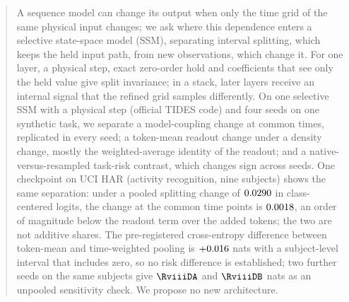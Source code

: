 \documentclass{article}
\theoremstyle{plain}
\theoremstyle{definition}
\theoremstyle{remark}
\begin{document}

\printAffiliationsAndNotice{}

\begin{abstract}
A sequence model can change its output when only the time grid of the same physical input changes; we ask where this dependence enters a selective state-space model (SSM), separating interval splitting, which keeps the held input path, from new observations, which change it.
For one layer, a physical step, exact zero-order hold and coefficients that see only the held value give split invariance; in a stack, later layers receive an internal signal that the refined grid samples differently.
On one selective SSM with a physical step (official TIDES code) and four seeds on one synthetic task, we separate a model-coupling change at common times, replicated in every seed; a token-mean readout change under a density change, mostly the weighted-average identity of the readout; and a native-versus-resampled task-risk contrast, which changes sign across seeds.
One checkpoint on UCI HAR (activity recognition, nine subjects) shows the same separation: under a pooled splitting change of $\HarCtRelAll$ in class-centered logits, the change at the common time points is $\HarCtRelEnd$, an order of magnitude below the readout term over the added tokens; the two are not additive shares.
The pre-registered cross-entropy difference between token-mean and time-weighted pooling is $\HarD$ nats with a subject-level interval that includes zero, so no risk difference is established; two further seeds on the same subjects give $\RviiiDA$ and $\RviiiDB$ nats as an unpooled sensitivity check. We propose no new architecture.
\end{abstract}

\end{document}
